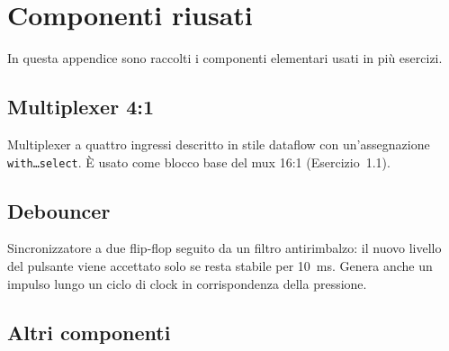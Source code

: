 \chapter{Componenti riusati}

In questa appendice sono raccolti i componenti elementari usati in più esercizi.

\section{Multiplexer 4:1}\label{app:mux4}

\progetto
Multiplexer a quattro ingressi descritto in stile dataflow con un'assegnazione
\texttt{with\ldots select}. È usato come blocco base del mux 16:1 (Esercizio~1.1).

\begin{porte}
\end{porte}

\implementazione
{}

\section{Debouncer}\label{app:debouncer}

\progetto
Sincronizzatore a due flip-flop seguito da un filtro antirimbalzo: il nuovo livello del
pulsante viene accettato solo se resta stabile per \SI{10}{\milli\second}. Genera anche un
impulso lungo un ciclo di clock in corrispondenza della pressione.

\implementazione
{}

\section{Altri componenti}
